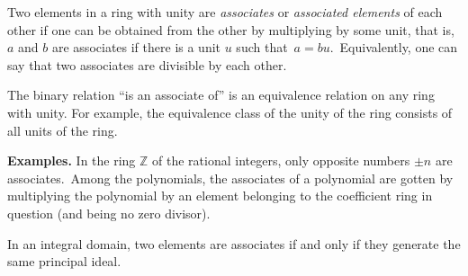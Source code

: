 \documentclass[12pt]{article}
\begin{document}
Two elements in a ring with unity are \emph{associates} or {\em associated elements} of each other
if one can be obtained from the other by multiplying by some unit,
that is, $a$ and $b$ are associates if there is a unit $u$ such that\,
$a = bu$.\, Equivalently, one can say that two associates are divisible by each other.

The binary relation ``is an associate of'' is an equivalence relation
on any ring with unity.  For example, the equivalence class of the
unity of the ring consists of all units of the ring.

\textbf{Examples.} In the ring $\mathbb{Z}$ of the rational integers, only opposite numbers $\pm n$ are associates.\, Among the polynomials, the associates of a polynomial are gotten by multiplying the polynomial by an element belonging to the coefficient ring in question (and being no zero divisor).

In an integral domain, two elements are associates if and only if they
generate the same principal ideal.

\end{document}
